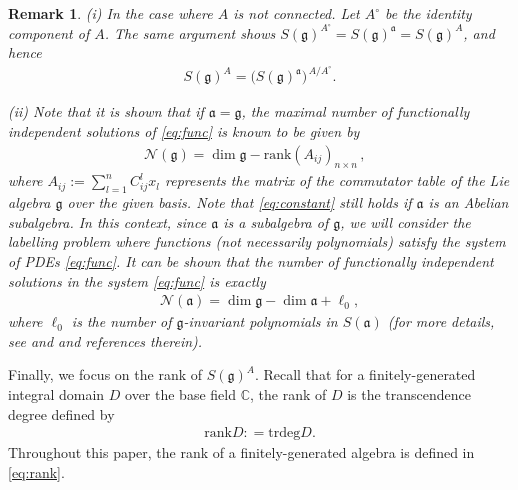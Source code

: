 \documentclass[11pt,reqno]{amsart}
\newtheorem*{theorem A}{Main Theorem A}
\newtheorem*{theorem B}{Main Theorem B}
\newtheorem*{theorem C}{Main Theorem C}
\newtheorem*{theorem D}{Main Theorem D}
\theoremstyle{definition}
\theoremstyle{plain}
\newtheorem{remark}[theorem]{Remark}
\theoremstyle{conclusion}
\begin{document}
\begin{remark} 
\label{rmk:property}
(i) In the case where $A$ is not connected. Let $A^\circ$ be the identity component of $A$. The same argument shows $ S(\mathfrak{g})^{A^\circ}=S(\mathfrak{g})^{\mathfrak{a}} = S(\mathfrak{g})^A$, and hence \begin{align*}
S(\mathfrak{g})^A=\bigl(S(\mathfrak{g})^{\mathfrak{a}}\bigr)^{\,A/A^\circ}.
\end{align*}

(ii)  Note that it is shown that if $\mathfrak{a} = \mathfrak{g}$, the maximal number of functionally independent solutions of \eqref{eq:func} is known to be given by \cite{MR0411412,MR0204094}
\begin{align}
    \mathcal{N} (\mathfrak{g}) = \dim  \mathfrak{g} - \mathrm{rank}(A_{ij} )_{n \times n} \, , \text{ } %
      \label{eq:constant}
\end{align} where $A_{ij} :=\sum_{l=1}^n C_{ij}^l x_l$ represents the matrix of the commutator table of the Lie algebra $\mathfrak{g}$ over the given basis. Note that \eqref{eq:constant} still holds if $\mathfrak{a}$ is an Abelian subalgebra. In this context, since $\mathfrak{a}$ is a subalgebra of $\mathfrak{g}$, we will consider the labelling problem where functions (not necessarily polynomials) satisfy the system of PDEs \eqref{eq:func}. It can be shown that the number of functionally independent solutions in the system \eqref{eq:func} is exactly \begin{align}
    \mathcal{N}(\mathfrak{a}) = \dim \mathfrak{g} - \dim \mathfrak{a} +  \ell_0,
\end{align} where $\ell_0$ is the number of $\mathfrak{g}$-invariant polynomials in $S(\mathfrak{a} )$  (for more details, see \cite{MR2276736,MR4660510,MR2515551} and \cite[Chapter 12, Section 12.1.5]{gtp} and references therein). 
\end{remark}

Finally, we focus on the rank of $S(\mathfrak{g})^A$. Recall that for a finitely-generated integral domain $D$ over the base field $\mathbb{C}$, the rank of $D$ is the transcendence degree defined by \begin{align}
    \mathrm{rank}  D: = \mathrm{trdeg}  D. \label{eq:rank}
\end{align} Throughout this paper, the rank of a finitely-generated algebra is defined in \eqref{eq:rank}.
\end{document}
